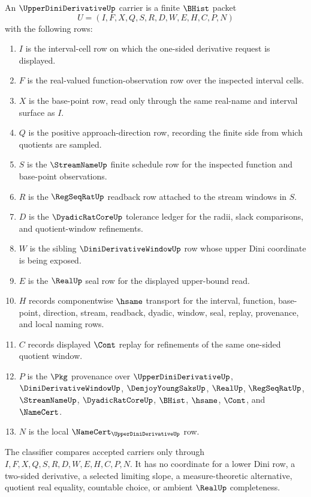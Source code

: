 \begin{definition}
\label{def:upper-dini-derivative-carrier}
An $\UpperDiniDerivativeUp$ carrier is a finite $\BHist$ packet
$$
U=(I,F,X,Q,S,R,D,W,E,H,C,P,N)
$$
with the following rows:
\begin{enumerate}
\item $I$ is the interval-cell row on which the one-sided derivative request is displayed.
\item $F$ is the real-valued function-observation row over the inspected interval cells.
\item $X$ is the base-point row, read only through the same real-name and interval surface as $I$.
\item $Q$ is the positive approach-direction row, recording the finite side from which quotients are sampled.
\item $S$ is the $\StreamNameUp$ finite schedule row for the inspected function and base-point observations.
\item $R$ is the $\RegSeqRatUp$ readback row attached to the stream windows in $S$.
\item $D$ is the $\DyadicRatCoreUp$ tolerance ledger for the radii, slack comparisons, and quotient-window refinements.
\item $W$ is the sibling $\DiniDerivativeWindowUp$ row whose upper Dini coordinate is being exposed.
\item $E$ is the $\RealUp$ seal row for the displayed upper-bound read.
\item $H$ records componentwise $\hsame$ transport for the interval, function, base-point, direction, stream, readback, dyadic, window, seal, replay, provenance, and local naming rows.
\item $C$ records displayed $\Cont$ replay for refinements of the same one-sided quotient window.
\item $P$ is the $\Pkg$ provenance over $\UpperDiniDerivativeUp$, $\DiniDerivativeWindowUp$, $\DenjoyYoungSaksUp$, $\RealUp$, $\RegSeqRatUp$, $\StreamNameUp$, $\DyadicRatCoreUp$, $\BHist$, $\hsame$, $\Cont$, and $\NameCert$.
\item $N$ is the local $\NameCert_{\UpperDiniDerivativeUp}$ row.
\end{enumerate}
The classifier compares accepted carriers only through $I,F,X,Q,S,R,D,W,E,H,C,P,N$. It has no coordinate for a lower Dini row, a two-sided derivative, a selected limiting slope, a measure-theoretic alternative, quotient real equality, countable choice, or ambient $\RealUp$ completeness.
\end{definition}

